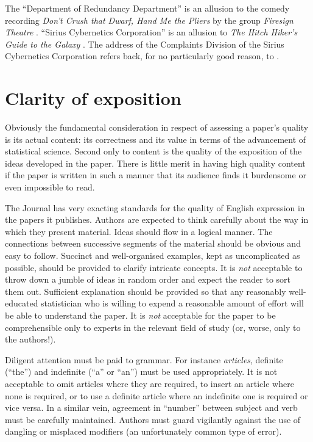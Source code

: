 \documentclass[
  times,
  doublespace]{anzsauth}
\begin{document}
The ``Department of Redundancy Department'' is an allusion to the comedy
recording \emph{Don't Crush that Dwarf, Hand Me the Pliers} by the group
\emph{Firesign Theatre} \citep{Firesign1970}. ``Sirius Cybernetics
Corporation'' is an allusion to \emph{The Hitch Hiker's Guide to the
Galaxy} \citep{Adams1979}. The address of the Complaints Division of the
Sirius Cybernetics Corporation refers back, for no particularly good
reason, to \citep{Firesign1970}.

\section{Clarity of exposition}\label{sec-clarExpos}

Obviously the fundamental consideration in respect of assessing a
paper's quality is its actual content: its correctness and its value in
terms of the advancement of statistical science. Second only to content
is the quality of the exposition of the ideas developed in the paper.
There is little merit in having high quality content if the paper is
written in such a manner that its audience finds it burdensome or even
impossible to read.

The Journal has very exacting standards for the quality of English
expression in the papers it publishes. Authors are expected to think
carefully about the way in which they present material. Ideas should
flow in a logical manner. The connections between successive segments of
the material should be obvious and easy to follow. Succinct and
well-organised examples, kept as uncomplicated as possible, should be
provided to clarify intricate concepts. It is \emph{not} acceptable to
throw down a jumble of ideas in random order and expect the reader to
sort them out. Sufficient explanation should be provided so that any
reasonably well-educated statistician who is willing to expend a
reasonable amount of effort will be able to understand the paper. It is
\emph{not} acceptable for the paper to be comprehensible only to experts
in the relevant field of study (or, worse, only to the authors!).

Diligent attention must be paid to grammar. For instance
\emph{articles}, definite (``the'') and indefinite (``a'' or ``an'')
must be used appropriately. It is not acceptable to omit articles where
they are required, to insert an article where none is required, or to
use a definite article where an indefinite one is required or vice
versa. In a similar vein, agreement in ``number'' between subject and
verb must be carefully maintained. Authors must guard vigilantly against
the use of dangling or misplaced modifiers (an unfortunately common type
of error).
\end{document}
